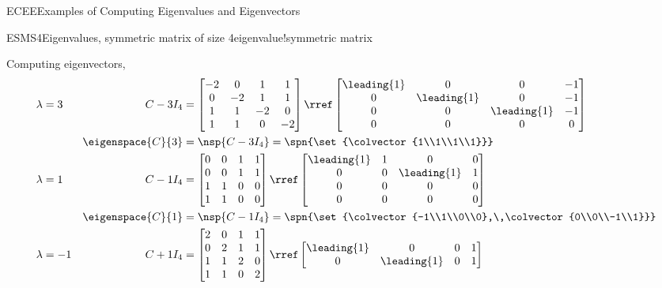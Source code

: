 \begin{subsect}{ECEE}{Examples of Computing Eigenvalues and Eigenvectors}
\begin{example}{ESMS4}{Eigenvalues, symmetric matrix of size 4}{eigenvalue!symmetric matrix}
%
\begin{para}Computing eigenvectors,
%
\begin{align*}
\lambda&=3&C- 3I_4&=
\begin{bmatrix}
-2 & 0 & 1 & 1\\
0 & -2 & 1 & 1\\
1 & 1 & -2 & 0\\
1 & 1 & 0 & -2
\end{bmatrix}
\rref
\begin{bmatrix}
\leading{1} & 0 & 0 & -1\\
0 & \leading{1} & 0 & -1\\
0 & 0 & \leading{1} & -1\\
0 & 0 & 0 & 0
\end{bmatrix}\\
&&\eigenspace{C}{3}&=\nsp{C-3I_4}
=\spn{\set{\colvector{1\\1\\1\\1}}}\\
%
\lambda&=1&C-1I_4&=
\begin{bmatrix}
0 & 0 & 1 & 1\\
0 & 0 & 1 & 1\\
1 & 1 & 0 & 0\\
1 & 1 & 0 & 0
\end{bmatrix}
\rref
\begin{bmatrix}
\leading{1} & 1 & 0 & 0\\
0 & 0 & \leading{1} & 1\\
0 & 0 & 0 & 0\\
0 & 0 & 0 & 0
\end{bmatrix}\\
&&\eigenspace{C}{1}&=\nsp{C-1I_4}
=\spn{\set{\colvector{-1\\1\\0\\0},\,\colvector{0\\0\\-1\\1}}}\\
%
\lambda&=-1&C+1I_4&=
\begin{bmatrix}
2 & 0 & 1 & 1\\
0 & 2 & 1 & 1\\
1 & 1 & 2 & 0\\
1 & 1 & 0 & 2
\end{bmatrix}
\rref
\begin{bmatrix}
\leading{1} & 0 & 0 & 1\\
0 & \leading{1} & 0 & 1\\

\end{bmatrix}
\end{align*}
\end{para}
\end{example}
\end{subsect}
